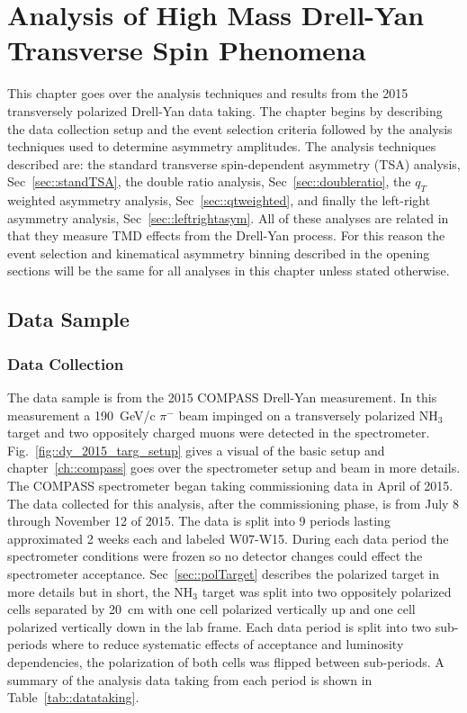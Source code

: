 \chapter{Analysis of High Mass Drell-Yan Transverse Spin Phenomena}
\label{ch::hmanalysis}
\ifpdf
\graphicspath{{Chapters/HMAnalysis/Figs/}}
\fi

This chapter goes over the analysis techniques and results from the 2015
transversely polarized Drell-Yan data taking.  The chapter begins by describing
the data collection setup and the event selection criteria followed by the
analysis techniques used to determine asymmetry amplitudes.  The analysis
techniques described are: the standard transverse spin-dependent asymmetry (TSA)
analysis, Sec~\ref{sec::standTSA}, the double ratio analysis,
Sec~\ref{sec::doubleratio}, the $q_T$ weighted asymmetry analysis,
Sec~\ref{sec::qtweighted}, and finally the left-right asymmetry analysis,
Sec~\ref{sec::leftrightasym}.  All of these analyses are related in that they
measure TMD effects from the Drell-Yan process.  For this reason the event
selection and kinematical asymmetry binning described in the opening sections
will be the same for all analyses in this chapter unless stated otherwise.

\section{Data Sample} \label{sec::datasample}

\subsection{Data Collection} \label{sec::datacollection}

The data sample is from the 2015 COMPASS Drell-Yan measurement.  In this
measurement a 190~GeV/c $\pi^-$ beam impinged on a transversely polarized NH$_3$
target and two oppositely charged muons were detected in the spectrometer.
Fig.~\ref{fig::dy_2015_targ_setup} gives a visual of the basic setup and
chapter~\ref{ch::compass} goes over the spectrometer setup and beam in more
details.  The COMPASS spectrometer began taking commissioning data in April of
2015.  The data collected for this analysis, after the commissioning phase, is
from July 8 through November 12 of 2015.  The data is split into 9 periods
lasting approximated 2 weeks each and labeled W07-W15.  During each data period
the spectrometer conditions were frozen so no detector changes could effect the
spectrometer acceptance.  Sec~\ref{sec::polTarget} describes the polarized
target in more details but in short, the NH$_3$ target was split into two
oppositely polarized cells separated by 20~cm with one cell polarized vertically
up and one cell polarized vertically down in the lab frame.  Each data period is
split into two sub-periods where to reduce systematic effects of acceptance and
luminosity dependencies, the polarization of both cells was flipped between
sub-periods.  A summary of the analysis data taking from each period is shown in
Table~\ref{tab::datataking}.

